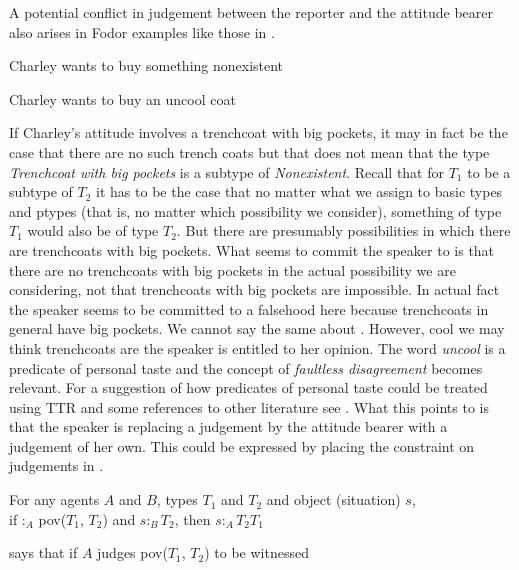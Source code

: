A potential conflict in judgement between the reporter and
the attitude bearer also arises in Fodor examples like those in
\nexteg{}.
\begin{ex} 
\begin{subex} 
 
\item Charley wants to buy something nonexistent 
 
\item Charley wants to buy an uncool coat 
 
\end{subex} 
   
\end{ex} 
If Charley's attitude involves a trenchcoat with big pockets, it may
in fact be the case that there are no such trench coats but that does
not mean that the type \textit{Trenchcoat with big pockets} is a
subtype of \textit{Nonexistent}.  Recall that for $T_1$ to be a
subtype of $T_2$ it has to be the case that no matter what we assign
to basic types and ptypes (that is, no matter which possibility we
consider), something of type $T_1$ would also be of
type $T_2$.  But there are presumably possibilities in which there are
trenchcoats with big pockets.  What  seems to commit the
speaker to is that there are no trenchcoats with big pockets in the
actual possibility we are considering, not that trenchcoats with big
pockets are impossible.  In actual fact the speaker seems to be
committed to a falsehood here because trenchcoats in general have big
pockets.  We cannot say the same about .  However, cool we
may think trenchcoats are the speaker is entitled to her opinion.  The
word \textit{uncool} is a predicate of personal taste and the concept
of \textit{faultless disagreement} \citep{Koelbel2004} becomes
relevant.  For a suggestion of how predicates of personal taste
could be treated using TTR and some references to other literature see
\cite{Cooper2015a}.  What this points to is that the speaker is
replacing a judgement by the attitude bearer with a judgement of her
own.  This could be expressed by placing the constraint on judgements in \nexteg{}.
\begin{ex} 

For any agents $A$ and $B$, types $T_1$ and $T_2$ and object
(situation) $s$, \\
\hspace*{2em}if :$_A$
pov($T_1$, $T_2$) and $s:_BT_2$, then $s:_AT_2$\fbox{\d{$\wedge$}}$T_1$
\label{ex:pov-constr} 
\end{ex} 
\preveg{} says that if $A$ judges pov($T_1$, $T_2$) to be witnessed
